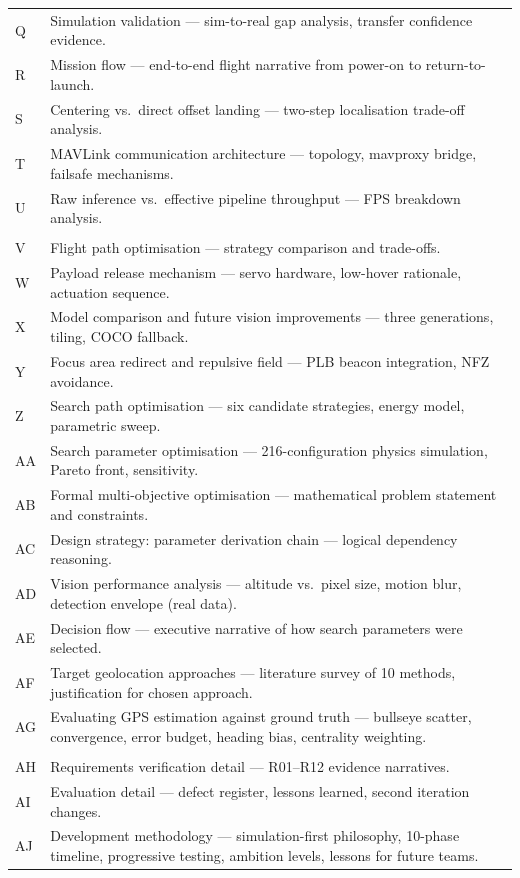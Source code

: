 \documentclass[10pt,a4paper]{article}
\begin{document}
\begin{tabularx}{\linewidth}{@{}l X@{}}
Q  & Simulation validation --- sim-to-real gap analysis, transfer confidence evidence. \\
R  & Mission flow --- end-to-end flight narrative from power-on to return-to-launch. \\
S  & Centering vs.\ direct offset landing --- two-step localisation trade-off analysis. \\
T  & MAVLink communication architecture --- topology, mavproxy bridge, failsafe mechanisms. \\
U  & Raw inference vs.\ effective pipeline throughput --- FPS breakdown analysis. \\
\addlinespace
\multicolumn{2}{@{}l}{\textit{Search, estimation, and system optimisation}} \\
V  & Flight path optimisation --- strategy comparison and trade-offs. \\
W  & Payload release mechanism --- servo hardware, low-hover rationale, actuation sequence. \\
X  & Model comparison and future vision improvements --- three generations, tiling, COCO fallback. \\
Y  & Focus area redirect and repulsive field --- PLB beacon integration, NFZ avoidance. \\
Z  & Search path optimisation --- six candidate strategies, energy model, parametric sweep. \\
AA & Search parameter optimisation --- 216-configuration physics simulation, Pareto front, sensitivity. \\
AB & Formal multi-objective optimisation --- mathematical problem statement and constraints. \\
AC & Design strategy: parameter derivation chain --- logical dependency reasoning. \\
AD & Vision performance analysis --- altitude vs.\ pixel size, motion blur, detection envelope (real data). \\
AE & Decision flow --- executive narrative of how search parameters were selected. \\
AF & Target geolocation approaches --- literature survey of 10 methods, justification for chosen approach. \\
AG & Evaluating GPS estimation against ground truth --- bullseye scatter, convergence, error budget, heading bias, centrality weighting. \\
\addlinespace
\multicolumn{2}{@{}l}{\textit{Extended body sections}} \\
AH & Requirements verification detail --- R01--R12 evidence narratives. \\
AI & Evaluation detail --- defect register, lessons learned, second iteration changes. \\
AJ & Development methodology --- simulation-first philosophy, 10-phase timeline, progressive testing, ambition levels, lessons for future teams. \\
\bottomrule
\end{tabularx}
\end{document}

